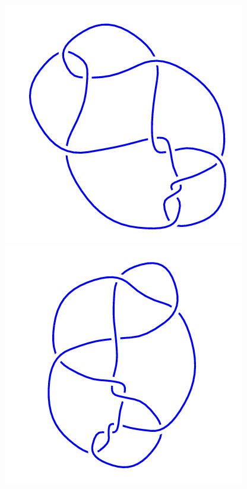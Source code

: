 \begin{figure}[H]
\begin{minipage}[b]{.18\linewidth}
	\end{minipage}
	\begin{minipage}[b]{.18\linewidth}
		\centering
		\includegraphics[width=\linewidth]{../data/10_29.png}
	\end{minipage}
	\begin{minipage}[b]{.18\linewidth}
		\centering
		\includegraphics[width=\linewidth]{../data/10_30.png}

\end{minipage}
\end{figure}
